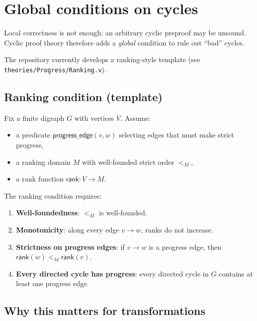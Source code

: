 \section{Global conditions on cycles}
\label{sec:global}

Local correctness is not enough: an arbitrary cyclic preproof may be unsound.
Cyclic proof theory therefore adds a \emph{global} condition to rule out ``bad'' cycles.

The repository currently develops a ranking-style template (see \texttt{theories/Progress/Ranking.v}).

\subsection{Ranking condition (template)}

Fix a finite digraph \(G\) with vertices \(V\).
Assume:
\begin{itemize}
\item a predicate \(\mathsf{progress\_edge}(v,w)\) selecting edges that must make strict progress,
\item a ranking domain \(M\) with well-founded strict order \(<_M\),
\item a rank function \(\mathsf{rank} : V \to M\).
\end{itemize}

The ranking condition requires:
\begin{enumerate}[label=(\alph*)]
\item \textbf{Well-foundedness}: \(<_M\) is well-founded.
\item \textbf{Monotonicity}: along every edge \(v\to w\), ranks do not increase.
\item \textbf{Strictness on progress edges}: if \(v\to w\) is a progress edge, then \(\mathsf{rank}(w) <_M \mathsf{rank}(v)\).
\item \textbf{Every directed cycle has progress}: every directed cycle in \(G\) contains at least one progress edge.
\end{enumerate}

\subsection{Why this matters for transformations}

